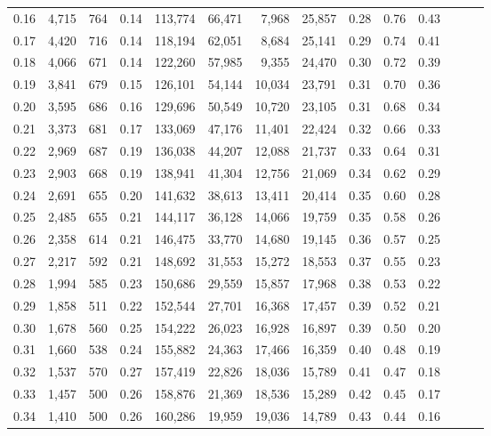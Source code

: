 \begin{tabular}{rrrrrrrrrrrrrr}
0.16 &   4,715 &  764 &  0.14 &  113,774 &   66,471 &   7,968 &  25,857 &  0.28 &  0.76 &      0.43 \\
0.17 &   4,420 &  716 &  0.14 &  118,194 &   62,051 &   8,684 &  25,141 &  0.29 &  0.74 &      0.41 \\
0.18 &   4,066 &  671 &  0.14 &  122,260 &   57,985 &   9,355 &  24,470 &  0.30 &  0.72 &      0.39 \\
0.19 &   3,841 &  679 &  0.15 &  126,101 &   54,144 &  10,034 &  23,791 &  0.31 &  0.70 &      0.36 \\
0.20 &   3,595 &  686 &  0.16 &  129,696 &   50,549 &  10,720 &  23,105 &  0.31 &  0.68 &      0.34 \\
0.21 &   3,373 &  681 &  0.17 &  133,069 &   47,176 &  11,401 &  22,424 &  0.32 &  0.66 &      0.33 \\
0.22 &   2,969 &  687 &  0.19 &  136,038 &   44,207 &  12,088 &  21,737 &  0.33 &  0.64 &      0.31 \\
0.23 &   2,903 &  668 &  0.19 &  138,941 &   41,304 &  12,756 &  21,069 &  0.34 &  0.62 &      0.29 \\
0.24 &   2,691 &  655 &  0.20 &  141,632 &   38,613 &  13,411 &  20,414 &  0.35 &  0.60 &      0.28 \\
0.25 &   2,485 &  655 &  0.21 &  144,117 &   36,128 &  14,066 &  19,759 &  0.35 &  0.58 &      0.26 \\
0.26 &   2,358 &  614 &  0.21 &  146,475 &   33,770 &  14,680 &  19,145 &  0.36 &  0.57 &      0.25 \\
0.27 &   2,217 &  592 &  0.21 &  148,692 &   31,553 &  15,272 &  18,553 &  0.37 &  0.55 &      0.23 \\
0.28 &   1,994 &  585 &  0.23 &  150,686 &   29,559 &  15,857 &  17,968 &  0.38 &  0.53 &      0.22 \\
0.29 &   1,858 &  511 &  0.22 &  152,544 &   27,701 &  16,368 &  17,457 &  0.39 &  0.52 &      0.21 \\
0.30 &   1,678 &  560 &  0.25 &  154,222 &   26,023 &  16,928 &  16,897 &  0.39 &  0.50 &      0.20 \\
0.31 &   1,660 &  538 &  0.24 &  155,882 &   24,363 &  17,466 &  16,359 &  0.40 &  0.48 &      0.19 \\
0.32 &   1,537 &  570 &  0.27 &  157,419 &   22,826 &  18,036 &  15,789 &  0.41 &  0.47 &      0.18 \\
0.33 &   1,457 &  500 &  0.26 &  158,876 &   21,369 &  18,536 &  15,289 &  0.42 &  0.45 &      0.17 \\
0.34 &   1,410 &  500 &  0.26 &  160,286 &   19,959 &  19,036 &  14,789 &  0.43 &  0.44 &      0.16 \\

\end{tabular}
